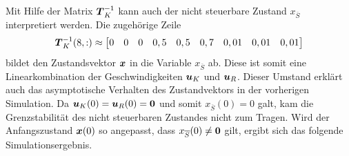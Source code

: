 Mit Hilfe der Matrix $\boldsymbol{T}^{-1}_K$ kann auch der nicht steuerbare Zustand $x_{\overline{S}}$ interpretiert werden. Die zugehörige Zeile
\begin{equation}
\boldsymbol{T}^{-1}_K(8,:) \approx \begin{bmatrix}
0 & 0 & 0 & 0,5 & 0,5 & 0,7 & 0,01 & 0,01 & 0,01
\end{bmatrix}
\end{equation}
bildet den Zustandsvektor $\boldsymbol{x}$ in die Variable $x_{\overline{S}}$ ab. Diese ist somit eine Linearkombination der Geschwindigkeiten $\boldsymbol{u}_K$ und $\boldsymbol{u}_R$. Dieser Umstand erklärt auch das asymptotische Verhalten des Zustandvektors in der vorherigen Simulation. Da $\boldsymbol{u}_K(0)=\boldsymbol{u}_R(0)=\boldsymbol{0}$ und somit $x_{\overline{S}}(0)=0$ galt, kam die Grenzstabilität des nicht steuerbaren Zustandes nicht zum Tragen. Wird der Anfangszustand $\boldsymbol{x}(0)$ so angepasst, dass $x_{\overline{S}}(0)\neq \boldsymbol{0}$ gilt, ergibt sich das folgende Simulationsergebnis.
\clearpage
